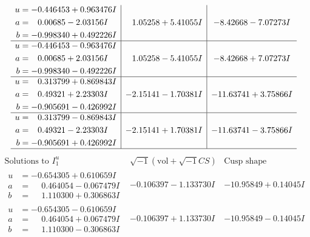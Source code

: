 \documentclass[1p]{elsarticle_modified}
\theoremstyle{definition}
\newcommand{\I}{\sqrt{-1}}
\begin{document}
$$\begin{array}{c|c|c}
\begin{aligned}
u &= -0.446453 + 0.963476 I \\
a &= \phantom{-}0.00685 - 2.03156 I \\
b &= -0.998340 + 0.492226 I\end{aligned}
 & \phantom{-}1.05258 + 5.41055 I & -8.42668 - 7.07273 I \\ \hline\begin{aligned}
u &= -0.446453 - 0.963476 I \\
a &= \phantom{-}0.00685 + 2.03156 I \\
b &= -0.998340 - 0.492226 I\end{aligned}
 & \phantom{-}1.05258 - 5.41055 I & -8.42668 + 7.07273 I \\ \hline\begin{aligned}
u &= \phantom{-}0.313799 + 0.869843 I \\
a &= \phantom{-}0.49321 + 2.23303 I \\
b &= -0.905691 - 0.426992 I\end{aligned}
 & -2.15141 - 1.70381 I & -11.63741 + 3.75866 I \\ \hline\begin{aligned}
u &= \phantom{-}0.313799 - 0.869843 I \\
a &= \phantom{-}0.49321 - 2.23303 I \\
b &= -0.905691 + 0.426992 I\end{aligned}
 & -2.15141 + 1.70381 I & -11.63741 - 3.75866 I\\
 \hline 
 \end{array}$$\newpage$$\begin{array}{c|c|c}  
\text{Solutions to }I^u_{1}& \I (\text{vol} + \sqrt{-1}CS) & \text{Cusp shape}\\
 \hline 
\begin{aligned}
u &= -0.654305 + 0.610659 I \\
a &= \phantom{-}0.464054 - 0.067479 I \\
b &= \phantom{-}1.110300 + 0.306863 I\end{aligned}
 & -0.106397 - 1.133730 I & -10.95849 + 0.14045 I \\ \hline\begin{aligned}
u &= -0.654305 - 0.610659 I \\
a &= \phantom{-}0.464054 + 0.067479 I \\
b &= \phantom{-}1.110300 - 0.306863 I\end{aligned}
 & -0.106397 + 1.133730 I & -10.95849 - 0.14045 I \\ \hline\begin{aligned}

\end{aligned}
\end{array}$$
\end{document}
